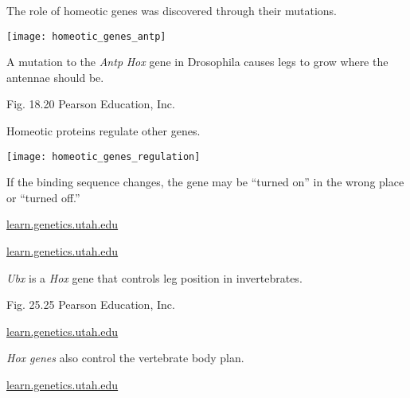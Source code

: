 \documentclass[t]{beamer}
\begin{document}
%
\begin{frame}[t]{The role of homeotic genes was discovered through their mutations.}
	\vspace*{-0.5\baselineskip}
	\begin{center}
		\texttt{[image: homeotic\_genes\_antp]}
	\end{center}
	
	A mutation to the \textit{Antp} \textit{Hox} gene in Drosophila causes legs to grow where the antennae should be.
	\vfilll

	\hfill \tiny Fig. 18.20 \textcopyright Pearson Education, Inc.
\end{frame}
%
\begin{frame}[t]{Homeotic proteins regulate other genes.}
	\vspace*{-0.5\baselineskip}
	\begin{center}
		\texttt{[image: homeotic\_genes\_regulation]}
	\end{center}
	
	If the binding sequence changes, the gene may be ``turned on'' in the wrong place or ``turned off.''
	\vfilll

	\hfill \tiny \href{http://learn.genetics.utah.edu/basics/hoxgenes}{learn.genetics.utah.edu}
\end{frame}
%
{
\begin{frame}[b]{}

	\tiny \href{http://learn.genetics.utah.edu/basics/hoxgenes}{learn.genetics.utah.edu}
\end{frame}
}
%
{
\begin{frame}[b]{\textit{Ubx} is a \textit{Hox} gene that controls leg position in invertebrates.}

	\hfill \tiny Fig. 25.25 \textcopyright Pearson Education, Inc.
\end{frame}
}
%
{
\begin{frame}[b]{}

	\tiny \href{http://learn.genetics.utah.edu/basics/hoxgenes}{learn.genetics.utah.edu}
\end{frame}
}
%
{
\begin{frame}[b]{\textit{Hox genes} also control the vertebrate body plan.}

	\tiny \href{http://learn.genetics.utah.edu/basics/hoxgenes}{learn.genetics.utah.edu}
\end{frame}
}
\end{document}
